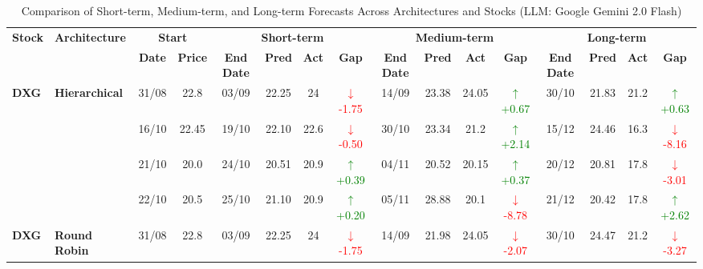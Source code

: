 \documentclass{ieeeaccess}
\begin{document}
\begin{table}[!h]
\centering
\caption{Comparison of Short-term, Medium-term, and Long-term Forecasts Across Architectures and Stocks (LLM: Google Gemini 2.0 Flash)}
\label{tab:full_forecast}
\setlength{\tabcolsep}{3pt}
\renewcommand{\arraystretch}{1.05}
\scriptsize
\begin{tabular}{llcc|cccc|cccc|cccc}
\toprule
\multirow{2}{*}{\textbf{Stock}} &
\multirow{2}{*}{\textbf{Architecture}} &
\multicolumn{2}{c|}{\textbf{Start}} &
\multicolumn{4}{c|}{\textbf{Short-term}} &
\multicolumn{4}{c|}{\textbf{Medium-term}} &
\multicolumn{4}{c}{\textbf{Long-term}} \\
\cmidrule(lr){3-4}
\cmidrule(lr){5-8}
\cmidrule(lr){9-12}
\cmidrule(lr){13-16}
& &
\textbf{Date} & \textbf{Price} &
\textbf{End Date} & \textbf{Pred} & \textbf{Act} & \textbf{Gap} &
\textbf{End Date} & \textbf{Pred} & \textbf{Act} & \textbf{Gap} &
\textbf{End Date} & \textbf{Pred} & \textbf{Act} & \textbf{Gap} \\
\midrule


\multirow{4}{*}{\textbf{DXG}} 
& \textbf{Hierarchical}
& 31/08 & 22.8 & 03/09 & 22.25 & 24 & \textcolor{red}{\(\downarrow\)-1.75} & 14/09 & 23.38 & 24.05 & \textcolor{green}{\(\uparrow\)+0.67} & 30/10 & 21.83 & 21.2 & \textcolor{green}{\(\uparrow\)+0.63} \\

& 
& 16/10 & 22.45 & 19/10 & 22.10 & 22.6 & \textcolor{red}{\(\downarrow\)-0.50} & 30/10 & 23.34 & 21.2 & \textcolor{green}{\(\uparrow\)+2.14} & 15/12 & 24.46 & 16.3 & \textcolor{red}{\(\downarrow\)-8.16} \\

& 
& 21/10 & 20.0 & 24/10 & 20.51 & 20.9 & \textcolor{green}{\(\uparrow\)+0.39} & 04/11 & 20.52 & 20.15 & \textcolor{green}{\(\uparrow\)+0.37} & 20/12 & 20.81 & 17.8 & \textcolor{red}{\(\downarrow\)-3.01} \\

&
& 22/10 & 20.5 & 25/10 & 21.10 & 20.9 & \textcolor{green}{\(\uparrow\)+0.20} & 05/11 & 28.88 & 20.1 & \textcolor{red}{\(\downarrow\)-8.78} & 21/12 & 20.42 & 17.8 & \textcolor{green}{\(\uparrow\)+2.62} \\
\midrule


\multirow{4}{*}{\textbf{DXG}} 
& \textbf{Round Robin}
& 31/08 & 22.8 & 03/09 & 22.25 & 24 & \textcolor{red}{\(\downarrow\)-1.75} & 14/09 & 21.98 & 24.05 & \textcolor{red}{\(\downarrow\)-2.07} & 30/10 & 24.47 & 21.2 & \textcolor{red}{\(\downarrow\)-3.27} \\


\end{tabular}
\end{table}
\end{document}
